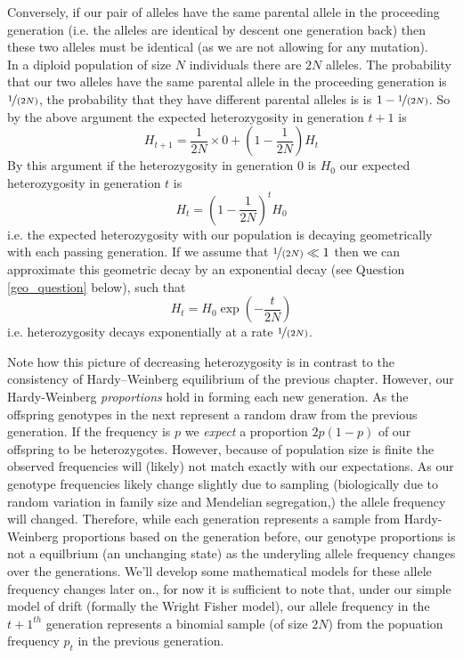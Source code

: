 Conversely, if our pair of alleles have the same parental allele in
the proceeding generation (i.e. the alleles are identical by descent
one generation back) then these two alleles must be identical (as we
are not allowing for any mutation). \\

In a diploid population of size $N$ individuals there are $2N$ alleles. The
probability that our two alleles have the same parental allele in the
proceeding generation is $\nicefrac{1}{(2N)}$, the probability that they have
different parental alleles is is $1-\nicefrac{1}{(2N)}$. So by the above
argument the expected heterozygosity in generation $t+1$ is
%
\begin{equation}
H_{t+1} = \frac{1}{2N} \times 0 + \left(1-\frac{1}{2N} \right)H_t
\end{equation}
%
By this argument if the heterozygosity in generation $0$ is $H_0$ our
expected heterozygosity in generation $t$ is
%
\begin{equation}
H_t = \left(1-\frac{1}{2N} \right)^tH_0
\end{equation}
%
i.e. the expected heterozygosity with our population is decaying
geometrically with each passing generation. If we assume that $\nicefrac{1}{(2N)}
\ll 1$ then we can approximate this geometric decay by an exponential
decay (see Question \ref{geo_question} below), such that
%
\begin{equation}
H_t =H_0 \exp \left(-\frac{t}{2N} \right)  
\end{equation}
%
i.e. heterozygosity decays exponentially at a rate $\nicefrac{1}{(2N)}$.

Note how this picture of decreasing heterozygosity is in contrast to the
consistency of Hardy--Weinberg equilibrium of the previous chapter. 
However, our Hardy-Weinberg \emph{proportions} hold in forming each new
generation. As the offspring genotypes in the next represent a random
draw from the previous generation. If the frequency is $p$ we
\emph{expect} a proportion $2p(1-p)$ of our offspring to be
heterozygotes. However, because of population size is finite the
observed frequencies will (likely) not match exactly with our
expectations. As our genotype frequencies likely change slightly due
to sampling (biologically due to random variation in family size
and Mendelian segregation,) the allele frequency will changed. 
Therefore, while each generation represents a sample from
Hardy-Weinberg proportions based on the generation before, our
genotype proportions is not a equilbrium (an unchanging state) as the
underyling allele frequency changes over the generations. We'll develop some mathematical models for these allele
frequency changes later on., for now it is sufficient to note that,
under our simple model of drift (formally the Wright Fisher model), our
allele frequency in the $t+1^{th}$ generation represents a binomial sample
(of size $2N$) from the popuation frequency $p_t$ in the previous
generation.  


